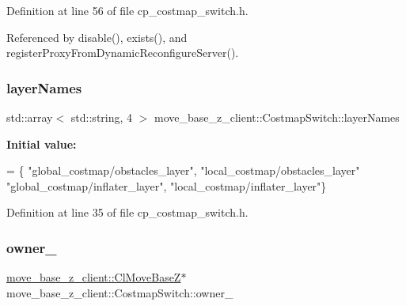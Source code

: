 Definition at line 56 of file cp\+\_\+costmap\+\_\+switch.\+h.



Referenced by disable(), exists(), and register\+Proxy\+From\+Dynamic\+Reconfigure\+Server().

\mbox{\label{classmove__base__z__client_1_1CostmapSwitch_adf295965004c939144db60ef353ad89e}} 
\subsubsection{\texorpdfstring{layer\+Names}{layerNames}}
{\footnotesize\ttfamily std\+::array$<$ std\+::string, 4 $>$ move\+\_\+base\+\_\+z\+\_\+client\+::\+Costmap\+Switch\+::layer\+Names\hspace{0.3cm}{\ttfamily [static]}}

{\bfseries Initial value\+:}
\begin{DoxyCode}
=
        \{
            \textcolor{stringliteral}{"global\_costmap/obstacles\_layer"},
            \textcolor{stringliteral}{"local\_costmap/obstacles\_layer"}
            \textcolor{stringliteral}{"global\_costmap/inflater\_layer"},
            \textcolor{stringliteral}{"local\_costmap/inflater\_layer"}\}
\end{DoxyCode}


Definition at line 35 of file cp\+\_\+costmap\+\_\+switch.\+h.

\mbox{\label{classmove__base__z__client_1_1CostmapSwitch_a00517c28045327007d7b9335c9b433ed}} 
\subsubsection{\texorpdfstring{owner\+\_\+}{owner\_}}
{\footnotesize\ttfamily \hyperlink{classmove__base__z__client_1_1ClMoveBaseZ}{move\+\_\+base\+\_\+z\+\_\+client\+::\+Cl\+Move\+BaseZ}$\ast$ move\+\_\+base\+\_\+z\+\_\+client\+::\+Costmap\+Switch\+::owner\+\_\+\hspace{0.3cm}{\ttfamily [private]}}




